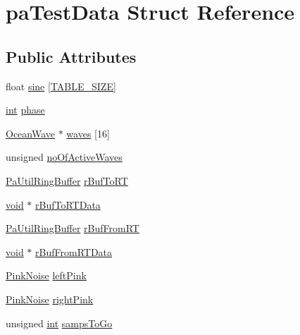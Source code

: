 \hypertarget{structpa_test_data}{}\section{pa\+Test\+Data Struct Reference}
\label{structpa_test_data}
\subsection*{Public Attributes}
\begin{DoxyCompactItemize}
\item 
float \hyperlink{structpa_test_data_ae193ea73c8894d186396d0730cf260e5}{sine} \mbox{[}\hyperlink{sine_8cxx_ada4ebb227211f96616c9e6681a944bc1}{T\+A\+B\+L\+E\+\_\+\+S\+I\+ZE}\mbox{]}
\item 
\hyperlink{xmltok_8h_a5a0d4a5641ce434f1d23533f2b2e6653}{int} \hyperlink{structpa_test_data_a64605f187ec79bda1bcbcc818781d486}{phase}
\item 
\hyperlink{struct_ocean_wave}{Ocean\+Wave} $\ast$ \hyperlink{structpa_test_data_a3329937562612094f827478bc793c441}{waves} \mbox{[}16\mbox{]}
\item 
unsigned \hyperlink{structpa_test_data_acc3a4830f0a4790f7435217066a38872}{no\+Of\+Active\+Waves}
\item 
\hyperlink{struct_pa_util_ring_buffer}{Pa\+Util\+Ring\+Buffer} \hyperlink{structpa_test_data_aafa0a9bff782eaa64a138eb9ef6f7207}{r\+Buf\+To\+RT}
\item 
\hyperlink{sound_8c_ae35f5844602719cf66324f4de2a658b3}{void} $\ast$ \hyperlink{structpa_test_data_aa2e7dd040f4bef5a3e0a10b7c63eb1d9}{r\+Buf\+To\+R\+T\+Data}
\item 
\hyperlink{struct_pa_util_ring_buffer}{Pa\+Util\+Ring\+Buffer} \hyperlink{structpa_test_data_a0d1af2a9de18eb7e1283aab8596b8c72}{r\+Buf\+From\+RT}
\item 
\hyperlink{sound_8c_ae35f5844602719cf66324f4de2a658b3}{void} $\ast$ \hyperlink{structpa_test_data_ab867d0c765fb0d8e59a2396824ee2b26}{r\+Buf\+From\+R\+T\+Data}
\item 
\hyperlink{struct_pink_noise}{Pink\+Noise} \hyperlink{structpa_test_data_a276b5eed3dc2e5b1fd8728a81c9f005a}{left\+Pink}
\item 
\hyperlink{struct_pink_noise}{Pink\+Noise} \hyperlink{structpa_test_data_a39779211244c56e7c6a5cff3f06db5eb}{right\+Pink}
\item 
unsigned \hyperlink{xmltok_8h_a5a0d4a5641ce434f1d23533f2b2e6653}{int} \hyperlink{structpa_test_data_a6327d3b5f0e9dabfdf4716b241b456ef}{samps\+To\+Go}

\end{DoxyCompactItemize}
